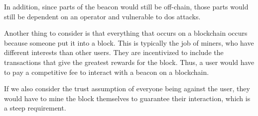 In addition, since parts of the beacon would still be off-chain, those parts would still be dependent on an operator and vulnerable to \acrshort{dos} attacks.

Another thing to consider is that everything that occurs on a blockchain occurs because someone put it into a block.
This is typically the job of miners, who have different interests than other users.
They are incentivized to include the transactions that give the greatest rewards for the block.
Thus, a user would have to pay a competitive fee to interact with a beacon on a blockchain.

If we also consider the trust assumption of everyone being against the user, they would have to mine the block themselves to guarantee their interaction, which is a steep requirement.
